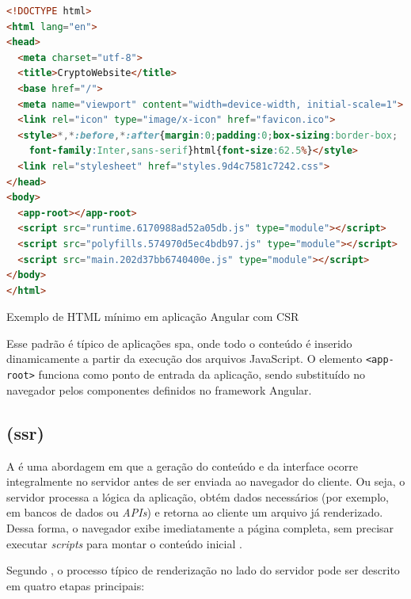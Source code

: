 \begin{codigo}[H]
  \begin{lstlisting}[language=html]
<!DOCTYPE html>
<html lang="en">
<head>
  <meta charset="utf-8">
  <title>CryptoWebsite</title>
  <base href="/">
  <meta name="viewport" content="width=device-width, initial-scale=1">
  <link rel="icon" type="image/x-icon" href="favicon.ico">
  <style>*,*:before,*:after{margin:0;padding:0;box-sizing:border-box;
    font-family:Inter,sans-serif}html{font-size:62.5%}</style>
  <link rel="stylesheet" href="styles.9d4c7581c7242.css">
</head>
<body>
  <app-root></app-root>
  <script src="runtime.6170988ad52a05db.js" type="module"></script>
  <script src="polyfills.574970d5ec4bdb97.js" type="module"></script>
  <script src="main.202d37bb6740400e.js" type="module"></script>
</body>
</html>
\end{lstlisting}
  \caption{Exemplo de HTML mínimo em aplicação Angular com CSR}
  \label{lst:angular_html}
\end{codigo}

Esse padrão é típico de aplicações \acrshort{spa}, onde todo o conteúdo é inserido dinamicamente a partir da execução dos arquivos JavaScript. O elemento \texttt{<app-root>} funciona como ponto de entrada da aplicação, sendo substituído no navegador pelos componentes definidos no framework Angular. {\cite{atori2024}}


\subsection{ (\acrshort{ssr})}
\label{subsec:ssr}

A \textbf{} é uma abordagem em que a geração do conteúdo e da interface ocorre integralmente no servidor antes de ser enviada ao navegador do cliente. Ou seja, o servidor processa a lógica da aplicação, obtém dados necessários (por exemplo, em bancos de dados ou \emph{APIs}) e retorna ao cliente um arquivo  já renderizado. Dessa forma, o navegador exibe imediatamente a página completa, sem precisar executar \emph{scripts} para montar o conteúdo inicial \cite{atori2024}. 

Segundo , o processo típico de renderização no lado do servidor pode ser descrito em quatro etapas principais:

